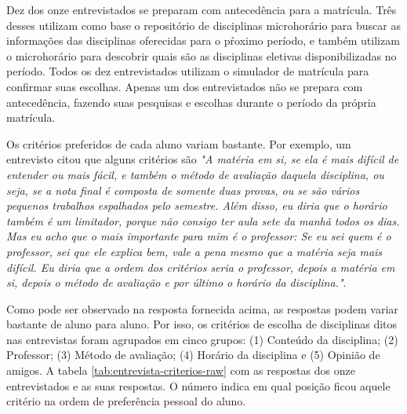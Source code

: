 Dez dos onze entrevistados se preparam com antecedência para a matrícula. Três desses utilizam como base o repositório de disciplinas microhorário para buscar as informações das disciplinas oferecidas para o pŕoximo período, e também utilizam o microhorário para descobrir quais são as disciplinas eletivas disponibilizadas no período. Todos os dez entrevistados utilizam o simulador de matrícula para confirmar suas escolhas. Apenas um dos entrevistados não se prepara com antecedência, fazendo suas pesquisas e escolhas durante o período da própria matrícula. 

Os critérios preferidos de cada aluno variam bastante. Por exemplo, um entrevisto citou que alguns critérios são  \textit{"A matéria em si, se ela é mais difícil de entender ou mais fácil, e também o método de avaliação daquela disciplina, ou seja, se a nota final é composta de somente duas provas, ou se são vários pequenos trabalhos espalhados pelo semestre. Além disso, eu diria que o horário também é um limitador, porque não consigo ter aula sete da manhã todos os dias. Mas eu acho que o mais importante para mim é o professor: Se eu sei quem é o professor, sei que ele explica bem, vale a pena mesmo que a matéria seja mais difícil. Eu diria que a ordem dos critérios seria o professor, depois a matéria em si, depois o método de avaliação e por último o horário da disciplina."}.

Como pode ser observado na resposta fornecida acima, as respostas podem variar bastante de aluno para aluno. Por isso, os critérios de escolha de disciplinas ditos nas entrevistas foram agrupados em cinco grupos: (1) Conteúdo da disciplina; (2) Professor; (3) Método de avaliação; (4) Horário da disciplina e (5) Opinião de amigos. A tabela \ref{tab:entrevista-criterios-raw} com as respostas dos onze entrevistados e as suas respostas. O número indica em qual posição ficou aquele critério na ordem de preferência pessoal do aluno.

